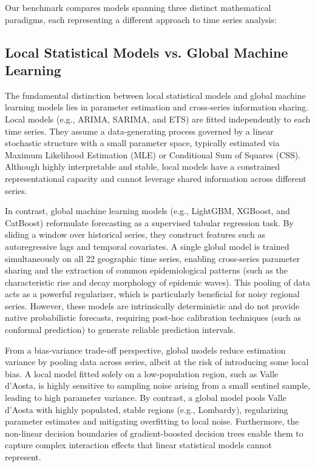 Our benchmark compares models spanning three distinct mathematical paradigms, each representing a different approach to time series analysis:

\subsection{Local Statistical Models vs. Global Machine Learning}
The fundamental distinction between local statistical models and global machine learning models lies in parameter estimation and cross-series information sharing. Local models (e.g., ARIMA, SARIMA, and ETS) are fitted independently to each time series. They assume a data-generating process governed by a linear stochastic structure with a small parameter space, typically estimated via Maximum Likelihood Estimation (MLE) or Conditional Sum of Squares (CSS). Although highly interpretable and stable, local models have a constrained representational capacity and cannot leverage shared information across different series.

In contrast, global machine learning models (e.g., LightGBM, XGBoost, and CatBoost) reformulate forecasting as a supervised tabular regression task. By sliding a window over historical series, they construct features such as autoregressive lags and temporal covariates. A single global model is trained simultaneously on all 22 geographic time series, enabling cross-series parameter sharing and the extraction of common epidemiological patterns (such as the characteristic rise and decay morphology of epidemic waves). This pooling of data acts as a powerful regularizer, which is particularly beneficial for noisy regional series. However, these models are intrinsically deterministic and do not provide native probabilistic forecasts, requiring post-hoc calibration techniques (such as conformal prediction) to generate reliable prediction intervals.

From a bias-variance trade-off perspective, global models reduce estimation variance by pooling data across series, albeit at the risk of introducing some local bias. A local model fitted solely on a low-population region, such as Valle d'Aosta, is highly sensitive to sampling noise arising from a small sentinel sample, leading to high parameter variance. By contrast, a global model pools Valle d'Aosta with highly populated, stable regions (e.g., Lombardy), regularizing parameter estimates and mitigating overfitting to local noise. Furthermore, the non-linear decision boundaries of gradient-boosted decision trees enable them to capture complex interaction effects that linear statistical models cannot represent.

